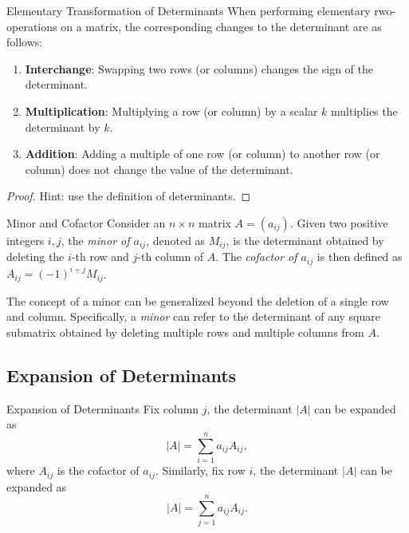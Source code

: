 \begin{proposition}{Elementary Transformation of Determinants}{}
  When performing elementary rwo-operations on a matrix,
  the corresponding changes to the determinant are as follows:
  \begin{enumerate}
  \item \textbf{Interchange}: Swapping two rows (or columns) changes the sign of
    the determinant.
  \item \textbf{Multiplication}: Multiplying a row (or column) by a scalar $k$
    multiplies the determinant by $k$.
  \item \textbf{Addition}: Adding a multiple of one row (or column) to another
    row (or column) does not change the value of the determinant.
  \end{enumerate}
\end{proposition}

\begin{proof}
  Hint: use the definition of determinants.
\end{proof}

\begin{definition}{Minor and Cofactor}{}
  Consider an $n \times n$ matrix $A = (a_{ij})$.
  Given two positive integers $i,j$,
  the \emph{minor of $a_{ij}$}, denoted as $M_{ij}$,
  is the determinant obtained by deleting the $i$-th row
  and $j$-th column of $A$.
  The \emph{cofactor of $a_{ij}$} is then defined as $A_{ij} = (-1)^{i+j}M_{ij}$.
\end{definition}

\begin{note}
  The concept of a minor can be generalized beyond the deletion of a single row
  and column.
  Specifically, a \emph{minor} can refer to the determinant of any square submatrix
  obtained by deleting multiple rows and multiple columns from $A$.
\end{note}

\subsection{Expansion of Determinants}

\begin{proposition}{Expansion of Determinants}{}
  Fix column $j$, the determinant $|A|$ can be expanded as
  \begin{equation}
    |A| = \sum\limits_{i = 1}^n a_{ij} A_{ij},
  \end{equation}
  where $A_{ij}$ is the cofactor of $a_{ij}$.
  Similarly, fix row $i$, the determinant $|A|$ can be expanded as
  \begin{equation}
    |A| = \sum\limits_{j = 1}^n a_{ij} A_{ij}.
  \end{equation}
\end{proposition}

